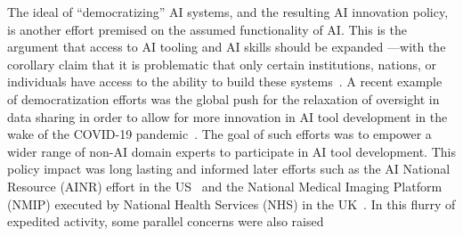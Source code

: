 \documentclass[acmconf,manuscript,screen,natbib=true]{acmart}
\begin{document}

The ideal of “democratizing” AI systems, and the resulting AI innovation policy, is another effort premised on the assumed functionality of AI. This is the argument that access to AI tooling and AI skills should be expanded %
\cite{democratization, democratization2, democratization3, democratizing_cloud}---with the corollary claim that it is problematic that only certain institutions, nations, or individuals have access to the ability to build these systems~\cite{de_democratizing}.
A recent example of democratization efforts was the global push for the relaxation of oversight in data sharing in order to allow for more innovation in AI tool development in the wake of the COVID-19 pandemic~\cite{covid_intl, covid_us, covid_greece, covid_china, covid_africa}. %
The goal of such efforts was to empower a wider range of non-AI domain experts to participate in AI tool development. This policy impact was long lasting and informed later efforts such as the AI National Resource (AINR) effort in the US~\cite{NAIR} and the National Medical Imaging Platform (NMIP) executed by National Health Services (NHS) in the UK~\cite{NMIP}. 
In this flurry of expedited activity, some parallel concerns were also raised 
\end{document}
